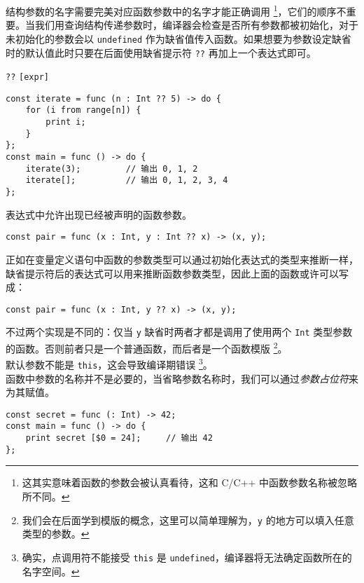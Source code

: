 结构参数的名字需要完美对应函数参数中的名字才能正确调用 \footnote{这其实意味着函数的参数会被认真看待，这和 C/C++ 中函数参数名称被忽略所不同。}，它们的顺序不重要。当我们用查询结构传递参数时，编译器会检查是否所有参数都被初始化，对于未初始化的参数会以 \lstinline!undefined! 作为缺省值传入函数。如果想要为参数设定缺省时的默认值此时只要在后面使用缺省提示符 \lstinline|??| 再加上一个表达式即可。

\begin{grammar} \label{grm:default-declaration}
	\lstinline!??! \texttt{[expr]}
\end{grammar}

\begin{lstlisting}
const iterate = func (n : Int ?? 5) -> do {
    for (i from range[n]) {
        print i;
    }
};
const main = func () -> do {
    iterate(3);         // 输出 0, 1, 2
    iterate[];          // 输出 0, 1, 2, 3, 4
};
\end{lstlisting}

表达式中允许出现已经被声明的函数参数。

\begin{lstlisting}
const pair = func (x : Int, y : Int ?? x) -> (x, y);
\end{lstlisting}

正如在变量定义语句中函数的参数类型可以通过初始化表达式的类型来推断一样，缺省提示符后的表达式可以用来推断函数参数类型，因此上面的函数或许可以写成：

\begin{lstlisting}
const pair = func (x : Int, y ?? x) -> (x, y);
\end{lstlisting}

不过两个实现是不同的：仅当 \lstinline!y! 缺省时两者才都是调用了使用两个 \lstinline!Int! 类型参数的函数。否则前者只是一个普通函数，而后者是一个函数模版 \footnote{我们会在后面学到模版的概念，这里可以简单理解为，\lstinline!y! 的地方可以填入任意类型的参数。}。 \\

默认参数不能是 \lstinline!this!，这会导致编译期错误 \footnote{确实，点调用符不能接受 \lstinline!this! 是 \lstinline!undefined!，编译器将无法确定函数所在的名字空间。}。 \\

函数中参数的名称并不是必要的，当省略参数名称时，我们可以通过\emph{参数占位符}来为其赋值。

\begin{lstlisting}
const secret = func (: Int) -> 42;
const main = func () -> do {
	print secret [$0 = 24];		// 输出 42
};
\end{lstlisting}

